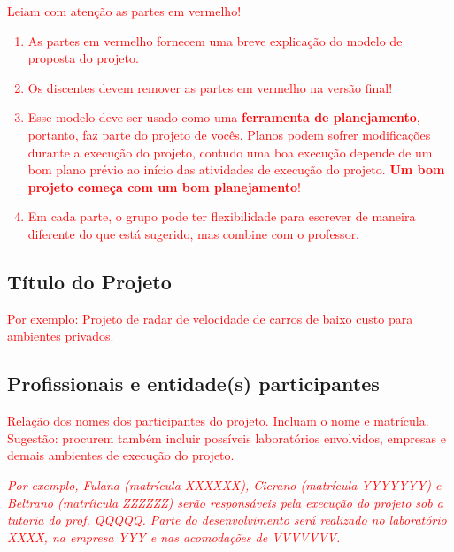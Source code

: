 \textcolor{red}{Leiam com atenção as partes em vermelho!}
\textcolor{red}{ 
\begin{enumerate}
    \item As partes em vermelho fornecem uma breve explicação do modelo de proposta do projeto. 
    \item Os discentes devem remover as partes em vermelho na versão final!
    \item Esse modelo deve ser usado como uma \textbf{ferramenta de planejamento}, portanto, faz parte do projeto de vocês. Planos podem sofrer modificações durante a execução do projeto, contudo uma boa execução depende de um bom plano prévio ao início das atividades de execução do projeto. \textbf{Um bom projeto começa com um bom planejamento}!
    \item Em cada parte, o grupo pode ter flexibilidade para escrever de maneira diferente do que  está sugerido, mas combine com o professor.
\end{enumerate}
}

\subsection{Título do Projeto}

\textcolor{red}{Por exemplo: Projeto de radar de velocidade de carros de baixo custo para ambientes privados.} 

\subsection{Profissionais e entidade(s) participantes}

\textcolor{red}{Relação dos nomes dos participantes do projeto. Incluam o nome e matrícula. Sugestão: procurem também incluir possíveis laboratórios envolvidos, empresas e demais ambientes de execução do projeto.}

\textcolor{red}{\textit{Por exemplo, Fulana (matrícula XXXXXX), Cicrano (matrícula YYYYYYY) e  Beltrano (matríicula ZZZZZZ) serão responsáveis pela execução do projeto sob a tutoria do prof. QQQQQ. Parte do desenvolvimento será realizado no laboratório XXXX, na empresa YYY e nas acomodações de VVVVVVV.}}